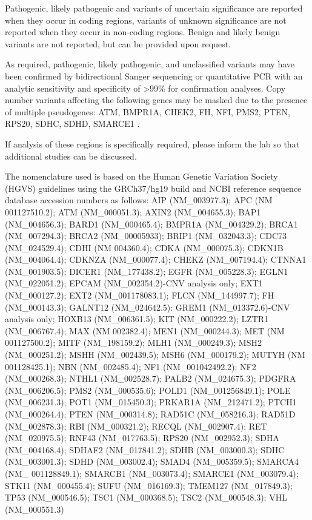 \documentclass[10pt]{article}
\begin{document}
Pathogenic, likely pathogenic and variants of uncertain significance are reported when they occur in coding regions, variants of unknown significance are not reported when they occur in non-coding regions. Benign and likely benign variants are not reported, but can be provided upon request.

As required, pathogenic, likely pathogenic, and unclassified variants may have been confirmed by bidirectional Sanger sequencing or quantitative PCR with an analytic sensitivity and specificity of >99\% for confirmation analyses. Copy number variants affecting the following genes may be masked due to the presence of multiple pseudogenes: ATM, BMPR1A, CHEK2, FH, NFI, PMS2, PTEN, RPS20, SDHC, SDHD, SMARCE1 .

If analysis of these regions is specifically required, please inform the lab so that additional studies can be discussed.

The nomenclature used is based on the Human Genetic Variation Society (HGVS) guidelines using the GRCh37/hg19 build and NCBI reference sequence database accession numbers as follows: AIP (NM\_003977.3); APC (NM 001127510.2); ATM (NM\_000051.3); AXIN2 (NM\_004655.3); BAP1 (NM\_004656.3); BARD1 (NM\_000465.4); BMPR1A (NM\_004329.2); BRCA1 (NM\_007294.3); BRCA2 (NM\_00005933); BRIP1 (NM\_032043.3); CDC73 (NM\_024529.4); CDHI (NM 004360.4); CDKA (NM\_000075.3); CDKN1B (NM\_004064.4); CDKNZA (NM\_000077.4); CHEKZ (NM\_007194.4); CTNNA1 (NM\_001903.5); DICER1 (NM\_177438.2); EGFR (NM\_005228.3); EGLN1 (NM\_022051.2); EPCAM (NM\_002354.2)-CNV analysis only; EXT1 (NM\_000127.2); EXT2 (NM\_001178083.1); FLCN (NM\_144997.7); FH (NM\_000143.3); GALNT12 (NM\_024642.5): GREM1 (NM\_013372.6)-CNV analysis only; HOXB13 (NM\_006361.5); KIT (NM\_000222.2); LZTR1 (NM\_006767.4); MAX (NM 002382.4); MEN1 (NM\_000244.3); MET (NM 001127500.2); MITF (NM\_198159.2); MLH1 (NM\_000249.3); MSH2 (NM\_000251.2); MSHH (NM\_002439.5); MSH6 (NM\_000179.2); MUTYH (NM 001128425.1); NBN (NM\_002485.4); NF1 (NM\_001042492.2): NF2 (NM\_000268.3); NTHL1 (NM\_002528.7); PALB2 (NM\_024675.3); PDGFRA (NM\_006206.5); PMS2 (NM\_000535.6); POLD1 (NM\_001256849.1); POLE (NM\_006231.3); POT1 (NM\_015450.3); PRKAR1A (NM\_212471.2); PTCH1 (NM\_000264.4); PTEN (NM\_000314.8); RAD51C (NM\_058216.3); RAD51D (NM\_002878.3); RBI (NM\_000321.2); RECQL (NM\_002907.4); RET (NM\_020975.5); RNF43 (NM\_017763.5); RPS20 (NM\_002952.3); SDHA (NM\_004168.4); SDHAF2 (NM\_017841.2); SDHB (NM\_003000.3); SDHC (NM\_003001.3); SDHD (NM\_003002.4); SMAD4 (NM\_005359.5); SMARCA4 (NM\_ 001128849.1); SMARCB1 (NM\_003073.4); SMARCE1 (NM\_003079.4); STK11 (NM\_000455.4); SUFU (NM\_016169.3); TMEM127 (NM\_017849.3); TP53 (NM\_000546.5); TSC1 (NM\_000368.5); TSC2 (NM\_000548.3); VHL (NM\_000551.3)
\end{document}
